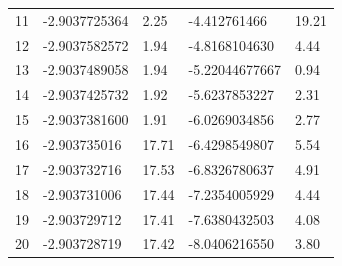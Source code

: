 \documentclass{pracalicmgr}
\begin{document}
\begin{longtable}[c]{lllll}
    11  & -2.9037725364  & 2.25   & -4.412761466   & 19.21   \\
    12  & -2.9037582572  & 1.94   & -4.8168104630  & 4.44    \\
    13  & -2.9037489058  & 1.94   & -5.22044677667 & 0.94    \\
    14  & -2.9037425732  & 1.92   & -5.6237853227  & 2.31    \\
    15  & -2.9037381600  & 1.91   & -6.0269034856  & 2.77    \\
    16  & -2.903735016   & 17.71  & -6.4298549807  & 5.54    \\
    17  & -2.903732716   & 17.53  & -6.8326780637  & 4.91    \\
    18  & -2.903731006   & 17.44  & -7.2354005929  & 4.44    \\
    19  & -2.903729712   & 17.41  & -7.6380432503  & 4.08    \\
    20  & -2.903728719   & 17.42  & -8.0406216550  & 3.80    \\ \hline
\end{longtable}





\newpage


\end{document}
